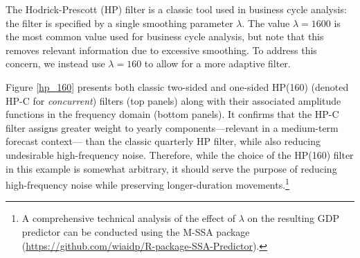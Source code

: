 \documentclass[11pt,a4paper]{article}
\begin{document}
The Hodrick-Prescott (HP) filter is a classic tool used in business cycle analysis: the filter is specified by a single smoothing parameter $\lambda$. The value $\lambda=1600$ is the most common value used for business cycle analysis, but \cite{Phillips_Jin_2021} note that this removes relevant information due to excessive smoothing. 
To address this concern, we instead use $\lambda = 160$ to allow for a more adaptive filter. 

Figure \eqref{hp_160} presents both classic two-sided and one-sided HP(160) (denoted HP-C for \textit{concurrent}) filters (top panels) along with their associated amplitude functions in the frequency domain (bottom panels). It confirms that the HP-C filter assigns greater weight to yearly components—relevant in a medium-term forecast context— than the classic quarterly HP filter, while also reducing undesirable high-frequency noise. Therefore, while the choice of the HP(160) filter in this example
is somewhat arbitrary, it should serve the purpose of reducing high-frequency noise while preserving longer-duration movements.\footnote{A comprehensive technical analysis of the effect of $\lambda$ on the resulting GDP predictor can be conducted using the M-SSA package (\url{https://github.com/wiaidp/R-package-SSA-Predictor}).}
\end{document}

